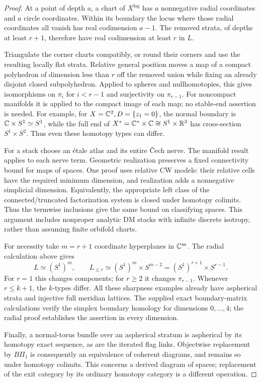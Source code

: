 \begin{proof}
At a point of depth \(a\), a chart of \(X^{\log}\) has \(a\)
nonnegative radial coordinates and \(a\) circle coordinates. Within
its boundary the locus where those radial coordinates all vanish
has real codimension \(a-1\). The removed strata, of depths at least
\(r+1\), therefore have real codimension at least \(r\) in \(L\).

Triangulate the corner charts compatibly, or round their corners and
use the resulting locally flat strata. Relative general position moves
a map of a compact polyhedron of dimension less than \(r\) off the
removed union while fixing an already disjoint closed subpolyhedron.
Applied to spheres and nullhomotopies, this gives isomorphisms on
\(\pi_i\) for \(i<r-1\) and surjectivity on \(\pi_{r-1}\).
For noncompact manifolds it is applied to the compact image of each
map; no stable-end assertion is needed. For example, for
\(X=\mathbb C^2,D=\{z_1=0\}\), the normal boundary is
\(\mathbb C\times S^1\simeq S^1\), while the full end of
\(X^*=\mathbb C^*\times\mathbb C\cong S^1\times\mathbb R^3\) has cross-section
\(S^1\times S^2\). Thus even these homotopy types can differ.

For a stack choose an \'{e}tale atlas and its entire \v{C}ech nerve.
The manifold result applies to each nerve term. Geometric realization
preserves a fixed connectivity bound for maps of spaces. One proof
uses relative CW models: their relative cells have the required
minimum dimension, and realization adds a nonnegative simplicial
dimension. Equivalently, the appropriate left class of the
connected/truncated factorization system is closed under homotopy
colimits. Thus the termwise inclusions give the same bound on
classifying spaces. This argument includes nonproper analytic DM
stacks with infinite discrete isotropy, rather than assuming finite
orbifold charts.

For necessity take \(m=r+1\) coordinate hyperplanes in \(\mathbb C^m\).
The radial calculation above gives
\[
 L\simeq(S^1)^m,\qquad
 L_{\leq r}\simeq(S^1)^m\times S^{m-2}
                    =(S^1)^{r+1}\times S^{r-1}.
\]
For \(r=1\) this changes components; for \(r\geq2\) it changes
\(\pi_{r-1}\). Whenever \(r\leq k+1\), the \(k\)-types differ.
All these sharpness examples already have aspherical strata and
injective full meridian lattices. The supplied exact boundary-matrix
calculations verify the simplex boundary homology for dimensions
\(0,\ldots,4\); the radial proof establishes the assertion in every dimension.

Finally, a normal-torus bundle over an aspherical stratum is
aspherical by its homotopy exact sequence, as are the iterated flag
links. Objectwise replacement by \(B\Pi_1\) is consequently an
equivalence of coherent diagrams, and remains so under homotopy
colimits. This concerns a derived diagram of spaces; replacement of
the exit category by its ordinary homotopy category is a different
operation.
\end{proof}

